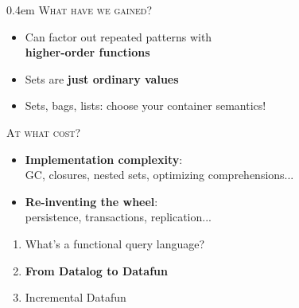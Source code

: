 \documentclass[xcolor=table,usenames,dvipsnames,svgnames]{beamer}
\begin{document}

\begin{frame}{}\large\parskip 0.4em
  \textsc{What have we gained?}
  \begin{itemize}\itemsep 0.5em
  \item Can factor out repeated patterns with\\ \textbf{higher-order functions}
  \item Sets are \textbf{just ordinary values}
  \item Sets, bags, lists: choose your container semantics!
  \end{itemize}

  \vspace{1em}\pause

  \textsc{At what cost?}
  \begin{itemize}
  \item \textbf{Implementation complexity}:\\
    {\small GC, closures, nested sets, optimizing comprehensions...}
  \item \textbf{Re-inventing the wheel}:\\
    {\small persistence, transactions, replication...}
  \end{itemize}

\end{frame}



\begin{frame}\Large
  \begin{enumerate} \itemsep 1.5em \color{gray}
  \item What's a functional query language?
  \item {\color{black}\bf From Datalog to Datafun}
  \item Incremental Datafun
  \end{enumerate}
\end{frame}
\end{document}
